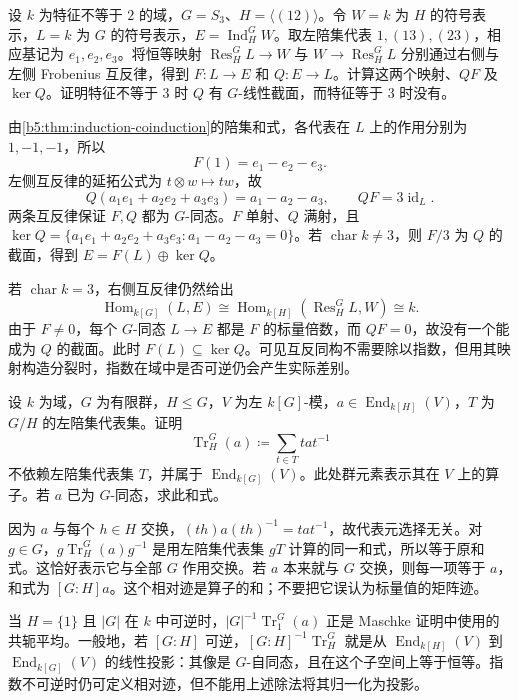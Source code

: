 \begin{exercise}\label{b5:ex:03-right-frobenius-explicit}
	设 \(k\) 为特征不等于 \(2\) 的域，\(G=S_3\)、\(H=\langle(12)\rangle\)。令 \(W=k\) 为 \(H\) 的符号表示，\(L=k\) 为 \(G\) 的符号表示，\(E=\operatorname{Ind}_H^G W\)。取左陪集代表 \(1,(13),(23)\)，相应基记为 \(e_1,e_2,e_3\)。将恒等映射 \(\operatorname{Res}_H^G L\to W\) 与 \(W\to\operatorname{Res}_H^G L\) 分别通过右侧与左侧 Frobenius 互反律，得到 \(F:L\to E\) 和 \(Q:E\to L\)。计算这两个映射、\(QF\) 及 \(\ker Q\)。证明特征不等于 \(3\) 时 \(Q\) 有 \(G\)-线性截面，而特征等于 \(3\) 时没有。
\end{exercise}
\begin{solution}
	由\cref{b5:thm:induction-coinduction}的陪集和式，各代表在 \(L\) 上的作用分别为 \(1,-1,-1\)，所以
	\[
		F(1)=e_1-e_2-e_3.
	\]
	左侧互反律的延拓公式为 \(t\otimes w\mapsto tw\)，故
	\[
		Q(a_1e_1+a_2e_2+a_3e_3)=a_1-a_2-a_3, \qquad QF=3\operatorname{id}_L.
	\]
	两条互反律保证 \(F,Q\) 都为 \(G\)-同态。\(F\) 单射、\(Q\) 满射，且 \(\ker Q=\{a_1e_1+a_2e_2+a_3e_3:a_1-a_2-a_3=0\}\)。若 \(\operatorname{char}k\ne3\)，则 \(F/3\) 为 \(Q\) 的截面，得到 \(E=F(L)\oplus\ker Q\)。

	若 \(\operatorname{char}k=3\)，右侧互反律仍然给出
	\[
		\operatorname{Hom}_{k[G]}(L,E) \cong\operatorname{Hom}_{k[H]}(\operatorname{Res}_H^G L,W) \cong k.
	\]
	由于 \(F\ne0\)，每个 \(G\)-同态 \(L\to E\) 都是 \(F\) 的标量倍数，而 \(QF=0\)，故没有一个能成为 \(Q\) 的截面。此时 \(F(L)\subseteq\ker Q\)。可见互反同构不需要除以指数，但用其映射构造分裂时，指数在域中是否可逆仍会产生实际差别。
\end{solution}

\begin{exercise}\label{b5:ex:03-relative-trace}
	设 \(k\) 为域，\(G\) 为有限群，\(H\le G\)，\(V\) 为左 \(k[G]\)-模，\(a\in\operatorname{End}_{k[H]}(V)\)，\(T\) 为 \(G/H\) 的左陪集代表集。证明
	\[
		\operatorname{Tr}_H^G(a)\coloneqq\sum_{t\in T}t a t^{-1}
	\]
	不依赖左陪集代表集 \(T\)，并属于 \(\operatorname{End}_{k[G]}(V)\)。此处群元素表示其在 \(V\) 上的算子。若 \(a\) 已为 \(G\)-同态，求此和式。
\end{exercise}
\begin{solution}
	因为 \(a\) 与每个 \(h\in H\) 交换，\((th)a(th)^{-1}=tat^{-1}\)，故代表元选择无关。对 \(g\in G\)，\(g\operatorname{Tr}_H^G(a)g^{-1}\) 是用左陪集代表集 \(gT\) 计算的同一和式，所以等于原和式。这恰好表示它与全部 \(G\) 作用交换。若 \(a\) 本来就与 \(G\) 交换，则每一项等于 \(a\)，和式为 \([G:H]a\)。这个相对迹是算子的和；不要把它误认为标量值的矩阵迹。

	当 \(H=\{1\}\) 且 \(|G|\) 在 \(k\) 中可逆时，\(|G|^{-1}\operatorname{Tr}_1^G(a)\) 正是 Maschke 证明中使用的共轭平均。一般地，若 \([G:H]\) 可逆，\([G:H]^{-1}\operatorname{Tr}_H^G\) 就是从 \(\operatorname{End}_{k[H]}(V)\) 到 \(\operatorname{End}_{k[G]}(V)\) 的线性投影：其像是 \(G\)-自同态，且在这个子空间上等于恒等。指数不可逆时仍可定义相对迹，但不能用上述除法将其归一化为投影。
\end{solution}

